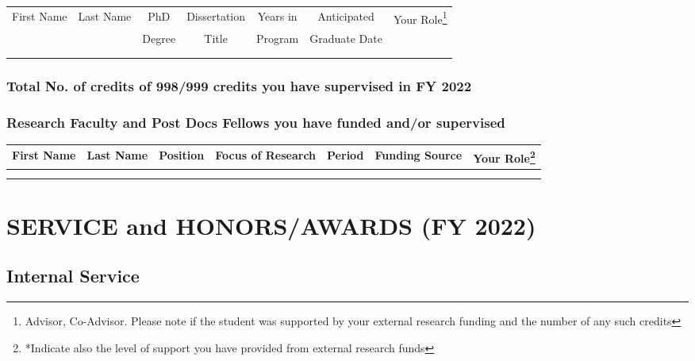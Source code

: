 \documentclass[11pt]{article}
\newcommand{\fy}{2022}
\begin{document}
\vspace{0.1in}

\begin{minipage}{\textwidth}
  \footnotesize
  \centering
  \begin{tabular}{ccccccc}
    \toprule
    First Name& Last Name& PhD & Dissertation& Years in& Anticipated& Your Role\footnote{Advisor, Co-Advisor. Please note if the student was supported by your external research funding and the number of any such credits}\\
    &&Degree& Title& Program& Graduate Date& \\
    \midrule
              &&&&\\
              &&&&
  \end{tabular}
\end{minipage}

\subsubsection{Total No. of credits of 998/999 credits you have supervised in FY \fy{}}

\subsubsection{Research Faculty and Post Docs Fellows you have funded and/or supervised}

\begin{minipage}{\textwidth}
  \footnotesize
  \centering
  \begin{tabular}{ccccccc}
    \toprule
    First Name& Last Name& Position& Focus of Research& Period& Funding Source &Your Role\footnote{*Indicate also the level of support you have provided from external research funds}\\
    \midrule
              &&&&&&\\
              &&&&&&
  \end{tabular}
\end{minipage}

\newpage
\section{SERVICE and HONORS/AWARDS (FY \fy{})}

\subsection{Internal Service}
\end{document}
